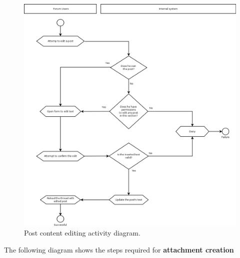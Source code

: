 \documentclass[12pt]{report}
\renewcommand\emph{\textbf}
\begin{document}
                    \begin{figure}[H]
                    \caption{Post content editing activity diagram.}
                    \centering
                    \includegraphics[width=1\textwidth]{di/5}
                    \end{figure}

                    \newpage

                    The following diagram shows the steps required for \emph{attachment creation}
\end{document}
